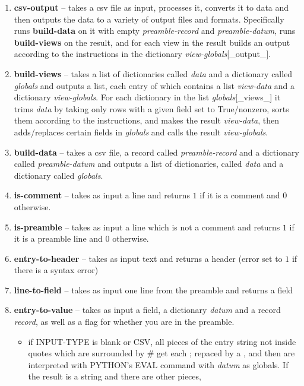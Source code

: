 \documentclass{article}
\begin{document}
\begin{enumerate}
\item \textbf{csv-output} -- takes a csv file as input, processes it,
  converts it to data and then outputs the data to a variety of output
  files and formats.  Specifically runs \textbf{build-data} on it with
  empty \emph{preamble-record} and \emph{preamble-datum}, runs
  \textbf{build-views} on the result, and for each view in the result
  builds an output according to the instructions in the dictionary \emph{view-globals}[\_output\_].
\item \textbf{build-views} -- takes a list of dictionaries called \emph{data}
  and a dictionary called \emph{globals} and outputs a list, each
  entry of which contains a list \emph{view-data} and a dictionary
  \emph{view-globals}.  For each dictionary in the list 
  \emph{globals}[\_views\_] it  trims \emph{data} by taking only rows
  with a given field set to True/nonzero, sorts them according to the
  instructions, and makes the result \emph{view-data}, then
  adds/replaces certain fields in \emph{globals} and calls the result \emph{view-globals}.
\item \textbf{build-data} -- takes a csv file, a record called
  \emph{preamble-record} and a dictionary called \emph{preamble-datum} and
  outputs a list of dictionaries, called  \emph{data} and a dictionary
  called \emph{globals}.
\item \textbf{is-comment} -- takes as input a line and returns $1$ if
it is a comment and $0$ otherwise.
\item \textbf{is-preamble} -- takes as input a line which is not a
  comment and returns $1$ if
it is a preamble line and $0$ otherwise.
\item \textbf{entry-to-header} -- takes as input text and returns a
  header (error set to $1$ if there is a syntax error)
\item \textbf{line-to-field}  -- takes as input one line from the
  preamble and returns a field
\item \textbf{entry-to-value} -- takes as input a field, a dictionary
  \emph{datum} and a record \emph{record}, as well as a flag for
  whether you are in the preamble.  
  \begin{itemize}
    \item if INPUT-TYPE is blank or CSV, all pieces of the entry
      string not inside quotes which are surrounded by \# get each ;
      repaced by a , and then are
      interpreted with PYTHON's EVAL command with \emph{datum} as
      globals.  If the result is a string and there are other pieces,

\end{itemize}
\end{enumerate}
\end{document}
